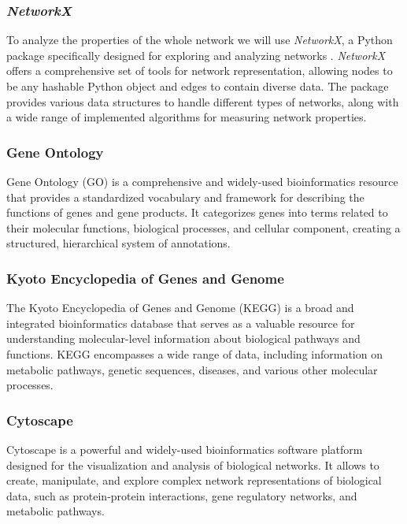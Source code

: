 \documentclass[10pt]{SelfArx} %
\begin{document}
\subsubsection*{\textit{NetworkX}}\label{sec:networkX}
To analyze the properties of the whole network we will use \textit{\textit{NetworkX}}, a Python package specifically designed for exploring and analyzing networks \cite{hagberg2008exploring}. \textit{NetworkX} offers a comprehensive set of tools for network representation, allowing nodes to be any hashable Python object and edges to contain diverse data. The package provides various data structures to handle different types of networks, along with a wide range of implemented algorithms for measuring network properties. 

\subsubsection*{Gene Ontology}\label{sec:gene_ontolgy}
Gene Ontology (GO) \cite{gene2019gene} is a comprehensive and widely-used bioinformatics resource that provides a standardized vocabulary and framework for describing the functions of genes and gene products. It categorizes genes into terms related to their molecular functions, biological processes, and cellular component, creating a structured, hierarchical system of annotations. 

\subsubsection*{Kyoto Encyclopedia of Genes and Genome}\label{sec:kegg}
The Kyoto Encyclopedia of Genes and Genome (KEGG) \cite{kanehisa2017kegg} is a broad and integrated bioinformatics database that serves as a valuable resource for understanding molecular-level information about biological pathways and functions. KEGG encompasses a wide range of data, including information on metabolic pathways, genetic sequences, diseases, and various other molecular processes. 

\subsubsection*{Cytoscape}\label{sec:cytoscape}
Cytoscape \cite{shannon2003cytoscape} is a powerful and widely-used bioinformatics software platform designed for the visualization and analysis of biological networks. It allows to create, manipulate, and explore complex network representations of biological data, such as protein-protein interactions, gene regulatory networks, and metabolic pathways. 
\end{document}
